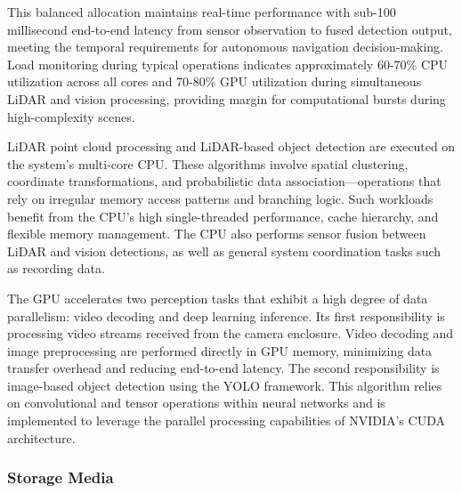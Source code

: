 \documentclass{erauthesis}
\begin{document}
This balanced allocation maintains real-time performance with sub-100 millisecond end-to-end latency from sensor observation to fused detection output, meeting the temporal requirements for autonomous navigation decision-making.
Load monitoring during typical operations indicates approximately 60-70\% CPU utilization across all cores and 70-80\% GPU utilization during simultaneous LiDAR and vision processing, providing margin for computational bursts during high-complexity scenes.


LiDAR point cloud processing and LiDAR-based object detection are executed on the system’s multi-core CPU.
These algorithms involve spatial clustering, coordinate transformations, and probabilistic data association—operations that rely on irregular memory access patterns and branching logic.
Such workloads benefit from the CPU’s high single-threaded performance, cache hierarchy, and flexible memory management.
The CPU also performs sensor fusion between LiDAR and vision detections, as well as general system coordination tasks such as recording data. %


The GPU accelerates two perception tasks that exhibit a high degree of data parallelism: video decoding and deep learning inference.
Its first responsibility is processing video streams received from the camera enclosure. 
Video decoding and image preprocessing are performed directly in GPU memory, minimizing data transfer overhead and reducing end-to-end latency.
The second responsibility is image-based object detection using the \ac{YOLO} framework. 
This algorithm relies on convolutional and tensor operations within neural networks and is implemented to leverage the parallel processing capabilities of NVIDIA’s CUDA architecture.

\subsubsection{Storage Media}
\end{document}
